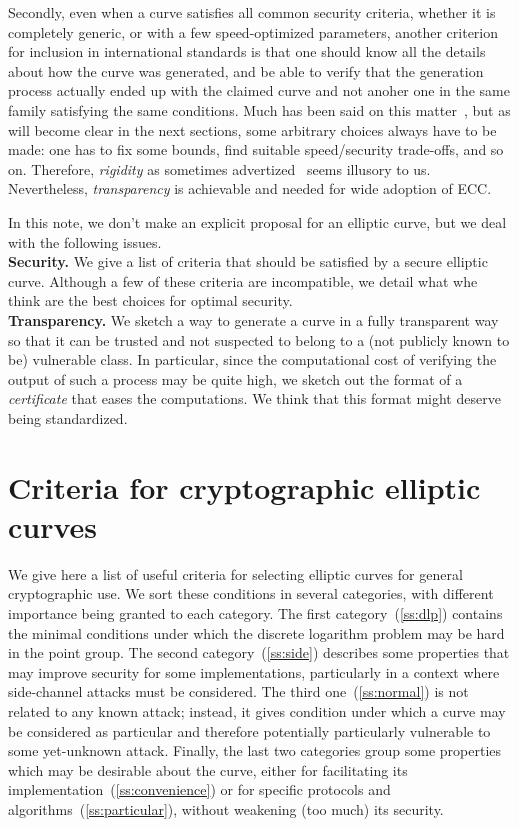 \documentclass[twocolumn,letterpaper,10pt]{article}
\begin{document}
\medskip
Secondly, even when a curve satisfies all common security criteria,
whether it is completely generic, or with a few speed-optimized parameters,
another criterion for inclusion in international standards is that
one should know all the details about how the curve was generated,
and be able to verify that the
generation process actually ended up with the claimed curve
and not anoher one in the same family satisfying the same conditions.
Much has been said on this matter~\cite{safecurves,msr2014bcln,eprint2014brainpool,eprint2013abgr},
but as will become clear in the next sections, some arbitrary choices always have
to be made: one has to fix some bounds,
find suitable speed/security trade-offs, and so on.
Therefore, \emph{rigidity} as sometimes advertized~\cite{safecurves} seems illusory
to us.
Nevertheless, \emph{transparency} is achievable and needed for wide adoption of ECC.

\medskip

In this note, we don't make an explicit proposal for an elliptic curve,
but we deal with the following issues.
\\{\bf Security. }
We give a list of criteria that should be satisfied by
a secure elliptic curve.
Although a few of these criteria are incompatible,
we detail what whe think are the best choices for optimal security.
\\{\bf Transparency. }
We sketch a way to generate a curve in a fully transparent way
so that it can be trusted and not suspected to
belong to a (not publicly known to be) vulnerable class.
In particular, since the computational cost of verifying
the output of such a process may be quite high,
we sketch out the format of a \emph{certificate} that eases the computations.
We think that this format might deserve being standardized.

\section{Criteria for cryptographic elliptic curves}
\label{s:criteria}
We give here a list of useful criteria for selecting elliptic curves
for general cryptographic use.
We sort these conditions in several categories,
with different importance being granted to each category.
The first category~(\ref{ss:dlp}) contains the minimal conditions under which
the discrete logarithm problem may be hard in the point group.
The second category~(\ref{ss:side}) describes some properties that
may improve security for some implementations,
particularly in a context where side-channel attacks must be considered.
The third one~(\ref{ss:normal}) is not related to any known attack;
instead, it gives condition under which a curve may be considered
as particular and therefore potentially particularly vulnerable
to some yet-unknown attack.
Finally, the last two categories group some properties
which may be desirable about the curve,
either for facilitating its implementation~(\ref{ss:convenience})
or for specific protocols and algorithms~(\ref{ss:particular}),
without weakening (too much) its security.
\end{document}
